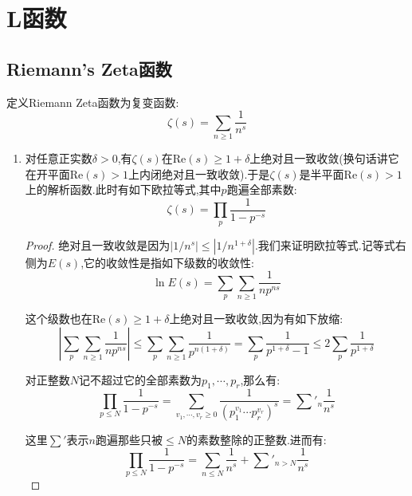 \newpage
\section{L函数}
\subsection{Riemann's Zeta函数}

定义Riemann Zeta函数为复变函数:
$$\zeta(s)=\sum_{n\ge1}\frac{1}{n^s}$$
\begin{enumerate}
	\item 对任意正实数$\delta>0$,有$\zeta(s)$在$\mathrm{Re}(s)\ge1+\delta$上绝对且一致收敛(换句话讲它在开平面$\mathrm{Re}(s)>1$上内闭绝对且一致收敛).于是$\zeta(s)$是半平面$\mathrm{Re}(s)>1$上的解析函数.此时有如下欧拉等式,其中$p$跑遍全部素数:
	$$\zeta(s)=\prod_p\frac{1}{1-p^{-s}}$$
	\begin{proof}
		
		绝对且一致收敛是因为$|1/n^s|\le|1/n^{1+\delta}|$.我们来证明欧拉等式.记等式右侧为$E(s)$,它的收敛性是指如下级数的收敛性:
		$$\ln E(s)=\sum_p\sum_{n\ge1}\frac{1}{np^{ns}}$$
		
		这个级数也在$\mathrm{Re}(s)\ge1+\delta$上绝对且一致收敛,因为有如下放缩:
		$$\left|\sum_p\sum_{n\ge1}\frac{1}{np^{ns}}\right|\le\sum_p\sum_{n\ge1}\frac{1}{p^{n(1+\delta)}}=\sum_p\frac{1}{p^{1+\delta}-1}\le2\sum_p\frac{1}{p^{1+\delta}}$$
		
		对正整数$N$记不超过它的全部素数为$p_1,\cdots,p_r$,那么有:
		$$\prod_{p\le N}\frac{1}{1-p^{-s}}=\sum_{v_1,\cdots,v_r\ge0}\frac{1}{(p_1^{v_1}\cdots p_r^{v_r})^s}=\sum'_n\frac{1}{n^s}$$
		
		这里$\sum'$表示$n$跑遍那些只被$\le N$的素数整除的正整数.进而有:
		$$\prod_{p\le N}\frac{1}{1-p^{-s}}=\sum_{n\le N}\frac{1}{n^s}+\sum'_{n>N}\frac{1}{n^s}$$
		

\end{proof}
\end{enumerate}
